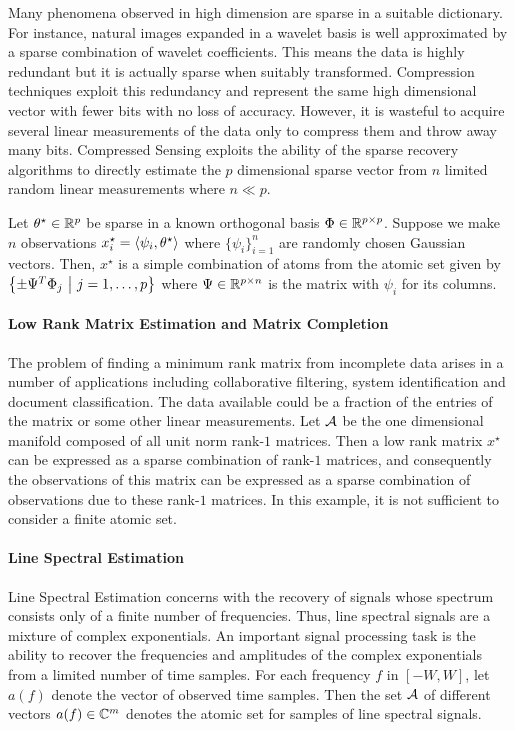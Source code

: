 Many phenomena observed in high dimension are sparse in a suitable dictionary.
For instance, natural images expanded in a wavelet basis is well approximated by
a sparse combination of wavelet coefficients. This means the data is highly
redundant but it is actually sparse when suitably transformed. Compression
techniques exploit this redundancy and represent the same high dimensional
vector with fewer bits with no loss of accuracy. However, it is wasteful to
acquire several linear measurements of the data only to compress them and throw
away many bits. Compressed Sensing exploits the ability of the sparse recovery
algorithms to directly estimate the $p$ dimensional sparse vector from $n$
limited random linear measurements where $n \ll p$.

Let $\theta^\star \in \mathbb{R}^p$ be sparse in a known orthogonal basis $\Phi \in
\mathbb{R}^{p \times p}$. Suppose we make $n$ observations $x^\star_i =
\langle\psi_i, \theta^\star\rangle$ where $\{\psi_i\}_{i=1}^n$ are randomly chosen
Gaussian vectors. Then, $x^\star$ is a simple combination of atoms from the
atomic set given by $\left\{ \pm \Psi^T \Phi_j ~\middle|~ j=1,\ldots,p \right\}$ where $\Psi \in
\mathbb{R}^{p \times n}$ is the matrix with $\psi_i$ for its columns.


\paragraph{Low Rank Matrix Estimation and Matrix Completion}

The problem of finding a minimum rank matrix from incomplete data arises in a
number of applications including collaborative filtering, system identification
and document classification. The data available could be a fraction of the
entries of the matrix or some other linear measurements. Let $\mathcal{A}$ be the one
dimensional manifold composed of all unit norm rank-$1$ matrices. Then a low
rank matrix $x^\star$ can be expressed as a sparse combination of rank-$1$
matrices, and consequently the observations of this matrix can be expressed as a sparse combination of observations due to these rank-$1$ matrices. In this example, it is not sufficient to consider a finite atomic set.

\paragraph{Line Spectral Estimation} Line Spectral Estimation concerns with
the recovery of signals whose spectrum consists only of a finite number of
frequencies. Thus, line spectral signals are a mixture of complex
exponentials. An important signal processing task is the ability to recover
the frequencies and amplitudes of the complex exponentials from a limited
number of time samples. For each frequency $f$ in $[-W,W]$, let $a(f)$ denote
the vector of observed time samples. Then the set $\mathcal{A}$ of different vectors
$a(f) \in \mathbb{C}^m$ denotes the atomic set for samples of line spectral signals.

